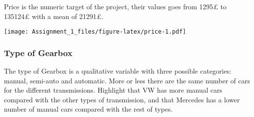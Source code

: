 \documentclass[
]{article}
\newenvironment{Shaded}{\begin{snugshade}}{\end{snugshade}}
\newcommand{\AttributeTok}[1]{\textcolor[rgb]{0.77,0.63,0.00}{#1}}
\newcommand{\CommentTok}[1]{\textcolor[rgb]{0.56,0.35,0.01}{\textit{#1}}}
\newcommand{\DecValTok}[1]{\textcolor[rgb]{0.00,0.00,0.81}{#1}}
\newcommand{\FunctionTok}[1]{\textcolor[rgb]{0.00,0.00,0.00}{#1}}
\newcommand{\NormalTok}[1]{#1}
\newcommand{\SpecialCharTok}[1]{\textcolor[rgb]{0.00,0.00,0.00}{#1}}
\newcommand{\StringTok}[1]{\textcolor[rgb]{0.31,0.60,0.02}{#1}}
\begin{document}
Price is the numeric target of the project, their values goes from 1295£
to 135124£ with a mean of 21291£.

\begin{Shaded}
\end{Shaded}

\texttt{[image: Assignment\_1\_files/figure-latex/price-1.pdf]}

\newpage

\hypertarget{type-of-gearbox}{%
\subsubsection{Type of Gearbox}\label{type-of-gearbox}}

The type of Gearbox is a qualitative variable with three possible
categories: manual, semi-auto and automatic. More or less there are the
same number of cars for the different transmissions. Highlight that VW
has more manual cars compared with the other types of transmission, and
that Mercedes has a lower number of manual cars compared with the rest
of types.
\end{document}
